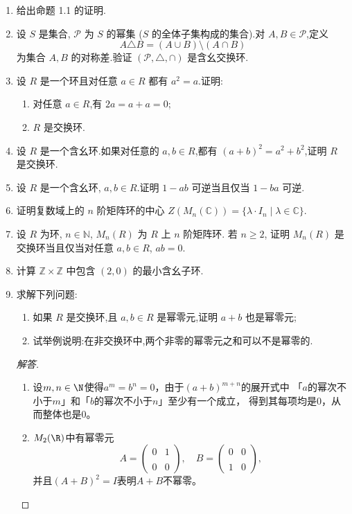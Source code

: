\begin{enumerate}
\item 给出命题 1.1 的证明.

\item 设 $ S $ 是集合, $\mathcal{P}$ 为 $ S $ 的幂集 ($ S $ 的全体子集构成的集合).对 $ A, B \in \mathcal{P}$,定义
\[
A \triangle B = (A \cup B) \setminus (A \cap B)
\]
为集合 $ A, B $ 的对称差.验证 $(\mathcal{P}, \triangle, \cap)$ 是含幺交换环.

\item 设 $ R $ 是一个环且对任意 $ a \in R $ 都有 $ a^2 = a $.证明:
\begin{enumerate}[label=(\arabic*)]
    \item 对任意 $ a \in R $,有 $ 2a = a + a = 0 $;
    \item $ R $ 是交换环.
\end{enumerate}

\item 设 $ R $ 是一个含幺环.如果对任意的 $ a, b \in R $,都有 $ (a + b)^2 = a^2 + b^2 $,证明 $ R $ 是交换环.

\item 设 $ R $ 是一个含幺环, $ a, b \in R $.证明 $ 1 - ab $ 可逆当且仅当 $ 1 - ba $ 可逆.

\item 证明复数域上的 $ n $ 阶矩阵环的中心 $ Z(M_n(\mathbb{C})) = \{\lambda \cdot I_n \mid \lambda \in \mathbb{C}\} $.

\item 设 $R$ 为环, $n \in \mathbb{N}$, $M_n(R)$ 为 $R$ 上 $n$ 阶矩阵环.
若 $n \geqslant 2$, 证明 $M_n(R)$ 是交换环当且仅当对任意 $a, b \in R$, $ab = 0$.

\item 计算 $ \mathbb{Z} \times \mathbb{Z} $ 中包含 $ (2, 0) $ 的最小含幺子环.

\item 求解下列问题:
\begin{enumerate}[label=(\arabic*)]
    \item 如果 $ R $ 是交换环,且 $ a, b \in R $ 是幂零元,证明 $ a + b $ 也是幂零元;
    \item 试举例说明:在非交换环中,两个非零的幂零元之和可以不是幂零的.
\end{enumerate}
\begin{proof}[解答]
    \begin{enumerate}[label=(\arabic*)]
    \item 设$m,n\in\N$使得$a^m=b^n=0$，由于$(a+b)^{m+n}$的展开式中
    「$a$的幂次不小于$m$」和「$b$的幂次不小于$n$」至少有一个成立，
    得到其每项均是$0$，从而整体也是$0$。
    \item $M_2(\R)$中有幂零元
    \[A=\begin{pmatrix}0&1\\ \\0&0\end{pmatrix}, 
    \quad B=\begin{pmatrix}0&0\\ \\1&0\end{pmatrix},\]
    并且$(A+B)^2=I$表明$A+B$不幂零。\qedhere
    \end{enumerate}
\end{proof}


\end{enumerate}
